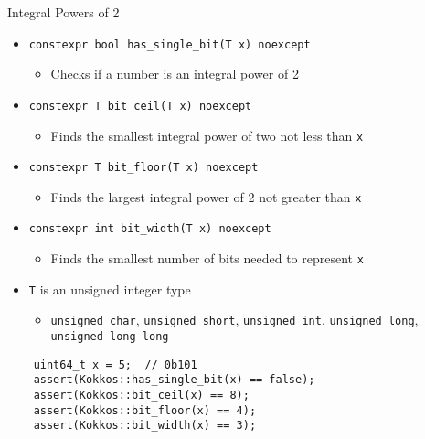 
\begin{frame}[fragile]{Integral Powers of 2}
	\begin{itemize}
		\item \texttt{constexpr bool has\_single\_bit(T x) noexcept}
		      \begin {itemize}
		\item Checks if a number is an integral power of 2
	\end{itemize}
	\item \texttt{constexpr T bit\_ceil(T x) noexcept}
	\begin {itemize}
	\item Finds the smallest integral power of two not less than \texttt{x}
	\end{itemize}   
	\item \texttt{constexpr T bit\_floor(T x) noexcept}
	\begin{itemize}
		\item Finds the largest integral power of 2 not greater than \texttt{x}
	\end{itemize}
	\item \texttt{constexpr int bit\_width(T x) noexcept}
	\begin{itemize}
		\item Finds the smallest number of bits needed to represent \texttt{x}
	\end{itemize}
	\vfill
	\item \texttt{T} is an unsigned integer type
	\begin{itemize}
		\item \texttt{unsigned char}, \texttt{unsigned short}, \texttt{unsigned int}, \texttt{unsigned long}, \texttt{unsigned long long}
	\end{itemize}
	\end{itemize}
	\lstset {language=C++}
	\begin{lstlisting}
    uint64_t x = 5;  // 0b101
    assert(Kokkos::has_single_bit(x) == false);
    assert(Kokkos::bit_ceil(x) == 8); 
    assert(Kokkos::bit_floor(x) == 4); 
    assert(Kokkos::bit_width(x) == 3); 
	\end{lstlisting}	
\end{frame}


